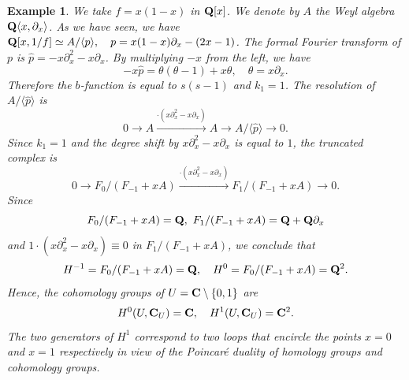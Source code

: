 \documentclass[12pt]{article}
\def\pd#1{ \partial_{#1} }
\def\C{{\bf C}}
\def\Q{{\bf Q}}
\newtheorem{example}{Example}[section]
\begin{document}
\begin{example} \rm
We take $f = x(1-x)$ in $\Q[x]$. We denote by $A$ the Weyl algebra
$\Q\langle x, \pd{x} \rangle$.
As we have seen, we have
$ \Q[x,1/f] \simeq A/\langle p \rangle , \quad p = x (1-x) \pd{x} - (2x-1)$.
The formal Fourier transform of $p$ is
$ {\hat p}= -x\pd{x}^2-x \pd{x}$.
By multiplying $-x$ from the left, we have
$$ -x{\hat p} = \theta(\theta-1) + x \theta , \quad \theta = x \pd{x}.$$
Therefore the $b$-function is equal to $s(s-1)$ and
$k_1 = 1$.
The resolution of $A/\langle {\hat p}\rangle$ is
$$
 0 \longrightarrow A
  \stackrel{\cdot (x \pd{x}^2-x \pd{x})}{\longrightarrow}
  A
  \longrightarrow
  A/\langle {\hat p}\rangle 
  \longrightarrow 0.
$$
Since $k_1=1$ and  the degree shift by
$x \pd{x}^2-x \pd{x}$ is equal to $1$,
the truncated complex is 
$$
 0 \longrightarrow
 F_0/( F_{-1} + xA )
 \stackrel{\cdot (x \pd{x}^2-x \pd{x})}{\longrightarrow}
 F_1/( F_{-1} + xA )
 \longrightarrow 0.
$$
Since
$$ F_0/( F_{-1}+ xA ) = \Q, \ 
   F_1/( F_{-1} + xA ) = \Q + \Q \pd{x}
$$
and
$ 1 \cdot (x \pd{x}^2-x \pd{x}) \equiv 0 $
in 
$  F_1/( F_{-1} + xA ) $,
we conclude that
$$ H^{-1} = F_0 / ( F_{-1} + xA ) = \Q, 
 \quad  H^{0} = F_0 / ( F_{-1} + xA ) = \Q^2. $$
Hence, the cohomology groups of $U= \C \setminus \{0, 1\}$
are
$$ H^0(U,\C_U) = \C, \quad H^1(U,\C_U) = \C^2. $$
The two generators of $H^1$ correspond to two loops that encircle
the points $x=0$ and $x=1$ respectively in view of the Poincar\'e duality
of homology groups and cohomology groups.
\end{example}
\end{document}
